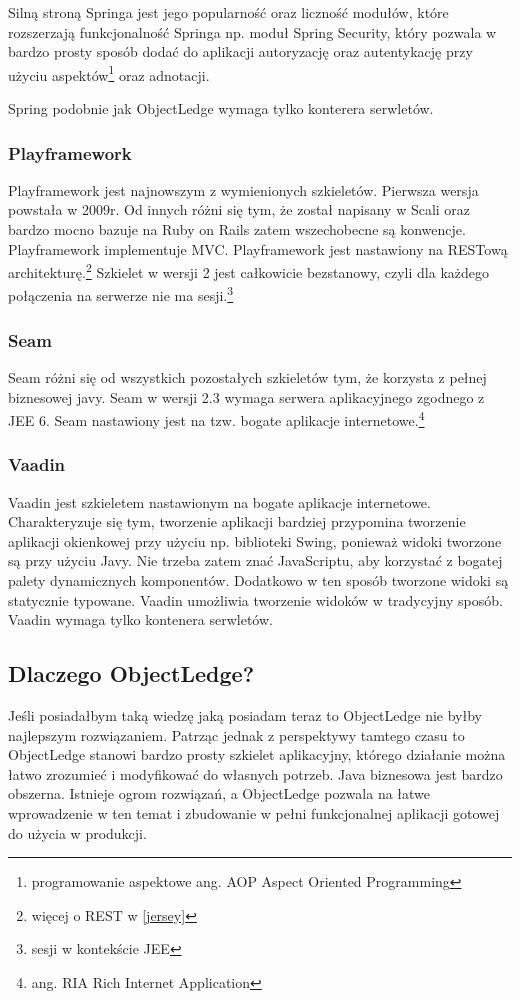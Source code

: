 \documentclass[a4paper,onecolumn,oneside,11pt,wide,floatssmall]{mwrep}
\theoremstyle{definition}
\theoremstyle{plain}%
\theoremstyle{remark}
\begin{document}
Silną stroną Springa jest jego popularność oraz liczność modułów, które rozszerzają funkcjonalność Springa np. moduł Spring Security, który pozwala w bardzo prosty sposób dodać do aplikacji autoryzację oraz autentykację przy użyciu aspektów\footnote{programowanie aspektowe ang. AOP Aspect Oriented Programming} oraz adnotacji.

Spring podobnie jak ObjectLedge wymaga tylko konterera serwletów.

\subsubsection{Playframework}
Playframework \cite{playframeworkHome} jest najnowszym z wymienionych szkieletów. Pierwsza wersja powstała w 2009r. Od innych różni się tym, że został napisany w Scali oraz bardzo mocno bazuje na Ruby on Rails zatem wszechobecne są konwencje. Playframework implementuje MVC. Playframework jest nastawiony na RESTową architekturę.\footnote{więcej o REST w \ref{jersey}} Szkielet w wersji 2 jest całkowicie bezstanowy, czyli dla każdego połączenia na serwerze nie ma sesji.\footnote{sesji w kontekście JEE}

\subsubsection{Seam}
Seam \cite{seamHome} różni się od wszystkich pozostałych szkieletów tym, że korzysta z pełnej biznesowej javy. Seam w wersji 2.3 wymaga serwera aplikacyjnego zgodnego z JEE 6. Seam nastawiony jest na tzw. bogate aplikacje internetowe.\footnote{ang. RIA Rich Internet Application}

\subsubsection{Vaadin}
Vaadin \cite{vaadinHome} jest szkieletem nastawionym na bogate aplikacje internetowe. Charakteryzuje się tym, tworzenie aplikacji bardziej przypomina tworzenie aplikacji okienkowej przy użyciu np. biblioteki Swing, ponieważ widoki tworzone są przy użyciu Javy. Nie trzeba zatem znać JavaScriptu, aby korzystać z bogatej palety dynamicznych komponentów. Dodatkowo w ten sposób tworzone widoki są statycznie typowane. Vaadin umożliwia tworzenie widoków w tradycyjny sposób. Vaadin wymaga tylko kontenera serwletów.

\subsection{Dlaczego ObjectLedge?}
Jeśli posiadałbym taką wiedzę jaką posiadam teraz to ObjectLedge nie byłby najlepszym rozwiązaniem. Patrząc jednak z perspektywy tamtego czasu to ObjectLedge stanowi bardzo prosty szkielet aplikacyjny, którego działanie można łatwo zrozumieć i modyfikować do własnych potrzeb. Java biznesowa jest bardzo obszerna. Istnieje ogrom rozwiązań, a ObjectLedge pozwala na łatwe wprowadzenie w ten temat i zbudowanie w pełni funkcjonalnej aplikacji gotowej do użycia w produkcji.
\end{document}
